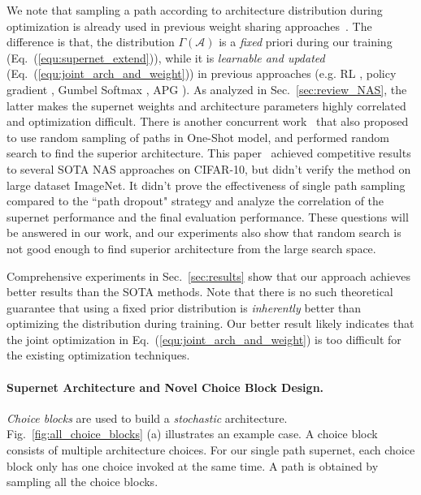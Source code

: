 We note that sampling a path according to architecture distribution during optimization is already used in previous weight sharing approaches~\cite{veniat2018learning,cai2018proxylessnas,zhang2018you,yao2019differentiable,dong2019searching,stamoulis2019single}. The difference is that, the distribution $\Gamma(\mathcal{A})$ is a \emph{fixed} priori during our training (Eq.~(\ref{equ:supernet_extend})), while it is \emph{learnable and updated} (Eq.~(\ref{equ:joint_arch_and_weight})) in previous approaches (e.g. RL \cite{pham2018efficient}, policy gradient \cite{veniat2018learning,cai2018proxylessnas}, Gumbel Softmax \cite{wu2018fbnet,xie2018snas}, APG \cite{zhang2018you}). As analyzed in Sec.~\ref{sec:review_NAS}, the latter makes the supernet weights and architecture parameters highly correlated and optimization difficult. There is another concurrent work~\cite{li2019random} that also proposed to use random sampling of paths in One-Shot model, and performed random search to find the superior architecture. This paper~\cite{li2019random} achieved competitive results to several SOTA NAS approaches on CIFAR-10, but didn't verify the method on large dataset ImageNet. It didn't prove the effectiveness of single path sampling compared to the ``path dropout" strategy and analyze the correlation of the supernet performance and the final evaluation performance. These questions will be answered in our work, and our experiments also show that random search is not good enough to find superior architecture from the large search space.

Comprehensive experiments in Sec.~\ref{sec:results} show that our approach achieves better results than the SOTA methods. Note that there is no such theoretical guarantee that using a fixed prior distribution is \emph{inherently} better than optimizing the distribution during training. Our better result likely indicates that the joint optimization in Eq.~(\ref{equ:joint_arch_and_weight}) is too difficult for the existing optimization techniques.

\paragraph{Supernet Architecture and Novel Choice Block Design. }
\emph{Choice blocks} are used to build a \emph{stochastic} architecture. Fig.~\ref{fig:all_choice_blocks} (a) illustrates an example case. A choice block consists of multiple architecture choices. For our single path supernet, each choice block only has one choice invoked at the same time. A path is obtained by sampling all the choice blocks.

